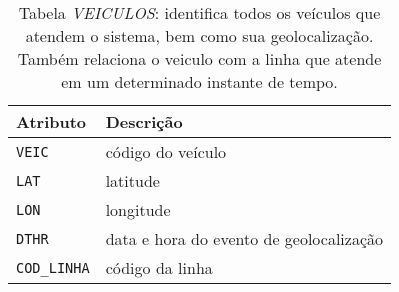 \begin{table}[htb]
    \caption{Tabela \emph{VEICULOS}: identifica todos os veículos que atendem o sistema, bem como sua geolocalização. Também relaciona o veiculo com a linha que atende em um determinado instante de tempo.}
    \centering
    \begin{tabular}{ p{5cm}p{9cm}} 
        \hline
        Atributo & Descrição\\
        \hline
        \texttt{VEIC} & código do veículo \\
        \texttt{LAT} & latitude \\
        \texttt{LON} & longitude  \\
        \texttt{DTHR} & data e hora do evento de geolocalização \\
        \texttt{COD\_LINHA} & código da linha \\
        \hline  
    \end{tabular}
    \label{tab:veiculos}
\end{table}








